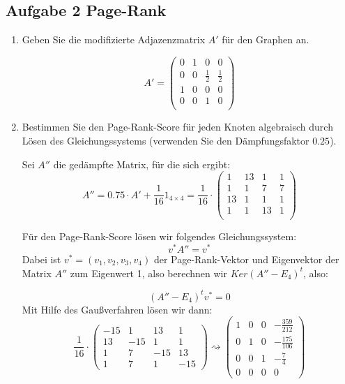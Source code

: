 \documentclass[11pt,a4paper,ngerman]{article}
\begin{document}
\subsection*{Aufgabe 2 \mdseries Page-Rank}

\begin{enumerate}[\bfseries a)]

\item Geben Sie die modifizierte Adjazenzmatrix $A'$ für den Graphen an.

$$ A' = 
\begin{pmatrix}
 0 & 1 & 0 & 0 \\
 0 & 0 & \frac{1}{2} & \frac{1}{2} \\
 1 & 0 & 0 & 0 \\
 0 & 0 & 1 & 0 \\
\end{pmatrix}
$$

\item Bestimmen Sie den Page-Rank-Score für jeden Knoten algebraisch durch Lösen des Gleichungssystems (verwenden Sie den Dämpfungsfaktor $0.25$).

Sei $A''$ die gedämpfte Matrix, für die sich ergibt:
$$ A'' = 0.75 \cdot A' + \frac{1}{16} 1_{4 \times 4} = \frac{1}{16} \cdot 
\begin{pmatrix}
 1 & 13 & 1 & 1 \\
 1 & 1 & 7 & 7 \\
 13 & 1 & 1 & 1 \\
 1 & 1 & 13 & 1 \\
\end{pmatrix}
$$

Für den Page-Rank-Score lösen wir folgendes Gleichungssystem:
$$ v^{*} A'' = v^{*}$$
Dabei ist $v^{*} = (v_1, v_2, v_3, v_4) $ der Page-Rank-Vektor und Eigenvektor der Matrix $A''$ zum Eigenwert 1, also berechnen wir $Ker(A'' - E_4)^{t}$, also:

$$ (A'' - E_4)^{t} v^{*} = 0 $$
Mit Hilfe des Gaußverfahren lösen wir dann:
$$
\frac{1}{16} \cdot
\begin{pmatrix}
 -15 & 1 & 13 & 1 \\
 13 & -15 & 1 & 1 \\
 1 & 7 & -15 & 13 \\
 1 & 7 & 1 & -15
\end{pmatrix}
  \rightsquigarrow
\begin{pmatrix}
 1 & 0 & 0 & - \frac{359}{212} \\
 0 & 1 & 0 & - \frac{175}{106} \\
 0 & 0 & 1 & - \frac{7}{4} \\
 0 & 0 & 0 & 0
\end{pmatrix}
$$


\end{enumerate}
\end{document}
